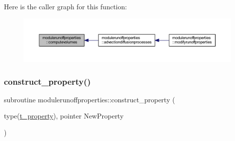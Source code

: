 Here is the caller graph for this function\+:\nopagebreak
\begin{figure}[H]
\begin{center}
\leavevmode
\includegraphics[width=350pt]{namespacemodulerunoffproperties_aebcfa403a8c7338421febfe72507ff1e_icgraph}
\end{center}
\end{figure}
\mbox{\label{namespacemodulerunoffproperties_aca58b5228ca3591f05eb014b1b370a57}} 
\subsubsection{\texorpdfstring{construct\+\_\+property()}{construct\_property()}}
{\footnotesize\ttfamily subroutine modulerunoffproperties\+::construct\+\_\+property (\begin{DoxyParamCaption}\item[{type(\mbox{\hyperlink{structmodulerunoffproperties_1_1t__property}{t\+\_\+property}}), pointer}]{New\+Property }\end{DoxyParamCaption})\hspace{0.3cm}{\ttfamily [private]}}

